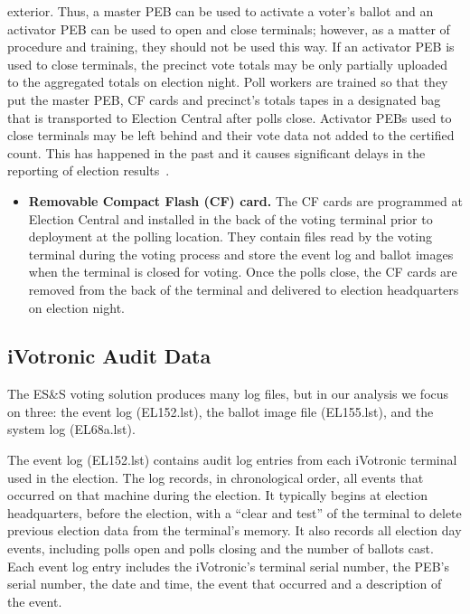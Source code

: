 exterior. Thus, a master PEB can be used to activate a voter's ballot
and an activator PEB can be used to open and close terminals; however,
as a matter of procedure and training, they should not be used this
way. If an activator PEB is used to close terminals, the precinct vote
totals may be only partially uploaded to the aggregated totals on
election night. Poll workers are trained so that they put the master
PEB, CF cards and precinct's totals tapes in a designated bag that is
transported to Election Central after polls close.  Activator PEBs
used to close terminals may be left behind and their vote data not
added to the certified count. This has happened in the past and it causes
significant delays in the reporting of election
results~\cite{Buell2011,Mazella2002}.  

\begin{itemize}
\item \textbf{Removable Compact Flash (CF) card.} The CF cards are
  programmed at Election Central and installed in the back of the
  voting terminal prior to deployment at the polling location. They contain files
  read by the voting terminal during the voting process and store the event log
  and ballot images when the terminal is closed for voting. Once the polls 
  close, the CF cards are removed from the back of the terminal and
  delivered to election headquarters on election night.  
\end{itemize}

\subsection{iVotronic Audit Data}
\smvertspace
The ES\&S voting solution produces many log files, but in our analysis we focus
on three: the event log (EL152.lst), the ballot image file (EL155.lst), and the
system log  (EL68a.lst).    

The event log (EL152.lst) contains audit log entries from each
iVotronic terminal used in the election.  The log  records, in
chronological order, all events that occurred on that machine during the
election. It typically begins at election headquarters, before the
election, with a \textquotedblleft clear and
test\textquotedblright \hspace{1 mm} of the terminal to delete
previous election data from the terminal's memory. It also records all
election day events, including polls open and polls closing and the
number of ballots cast.  Each event log entry includes the iVotronic's
terminal serial number, the PEB's serial number, the date and time,
the event that occurred and a description of the event. %
 
